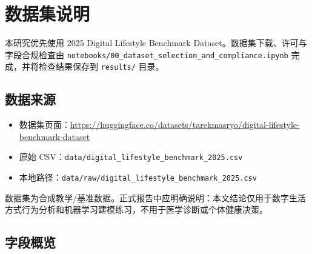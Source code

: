 \section{数据集说明}

本研究优先使用 2025 Digital Lifestyle Benchmark Dataset。数据集下载、许可与字段合规检查由 \texttt{notebooks/00\_dataset\_selection\_and\_compliance.ipynb} 完成，并将检查结果保存到 \texttt{results/} 目录。

\subsection{数据来源}

\begin{itemize}
  \item 数据集页面：\url{https://huggingface.co/datasets/tarekmasryo/digital-lifestyle-benchmark-dataset}
  \item 原始 CSV：\texttt{data/digital\_lifestyle\_benchmark\_2025.csv}
  \item 本地路径：\texttt{data/raw/digital\_lifestyle\_benchmark\_2025.csv}
\end{itemize}

数据集为合成教学/基准数据。正式报告中应明确说明：本文结论仅用于数字生活方式行为分析和机器学习建模练习，不用于医学诊断或个体健康决策。

\subsection{字段概览}

